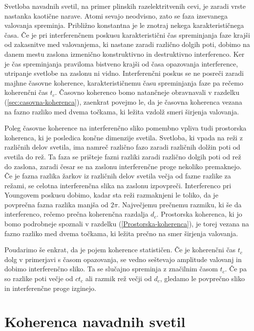 Svetloba navadnih svetil, na primer plinskih razelektritvenih cevi, 
je zaradi vrste nastanka kaotične narave. 
Atomi sevajo neodvisno, zato se faza izsevanega valovanja
spreminja. Približno konstantna je le znotraj nekega karakterističnega
časa. Če je pri interferenčnem poskusu karakteristični čas spreminjanja
faze krajši od zakasnitve med valovanjema, ki nastane zaradi različno
dolgih poti, dobimo na danem mestu zaslona izmenično konstruktivno in 
destruktivno interferenco. Ker je čas spreminjanja praviloma
bistveno krajši od časa opazovanja interference,
utripanje svetlobe na zaslonu ni vidno. Interferenčni poskus se ne 
posreči zaradi majhne časovne koherence,
karakterističnemu času spreminjanja faze pa rečemo 
koherenčni čas
$t_{c}$. Časovno koherenco bomo natančneje obravnavali v razdelku
(\ref{sec:casovna-koherenca}), zaenkrat povejmo le, da je časovna
koherenca vezana na fazno razliko med dvema točkama, ki ležita
vzdolž smeri širjenja valovanja. 

Poleg časovne koherence na interferenčno sliko pomembno vpliva tudi
prostorska koherenca, ki je posledica
končne dimenzije svetila. Svetloba, ki vpada na reži z različnih delov
svetila, ima namreč različno fazo zaradi različnih dolžin poti od
svetila do rež. Ta faza se prišteje fazni razliki zaradi različno
dolgih poti od rež do zaslona, zaradi česar se na zaslonu interferenčne
proge nekoliko premaknejo. Če je fazna razlika žarkov iz različnih
delov svetila večja od fazne razlike za režami, se celotna interferenčna
slika na zaslonu izpovpreči. Interferenco pri Youngovem poskusu
dobimo, kadar sta reži razmaknjeni le toliko, da je povprečna fazna
razlika manjša od $2\pi$. Največjemu prečnemu razmiku, ki še da interferenco,
rečemo prečna koherenčna razdalja $d_{c}$. 
Prostorska koherenca, ki jo bomo podrobneje spoznali v razdelku 
(\ref{Prostorska-koherenca}),
je torej vezana na fazno razliko med dvema točkama, ki ležita prečno 
na smer širjenja valovanja.

Poudarimo še enkrat, da je pojem koherence statističen.
Če je koherenčni čas $t_{c}$ dolg v primerjavi s časom opazovanja,
se vedno seštevajo amplitude valovanj in dobimo interferenčno sliko.
Ta se slučajno spreminja z značilnim časom $t_{c}$. Če pa so razlike
poti večje od $ct_{c}$ ali razmik rež večji od $d_{c}$, gledamo
le povprečno sliko in interferenčne proge izginejo.

\section{Koherenca navadnih svetil}


